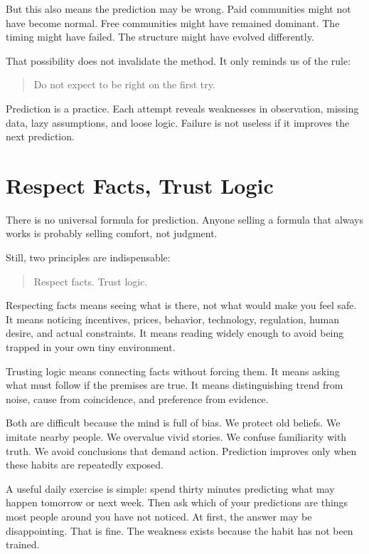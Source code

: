 But this also means the prediction may be wrong. Paid communities might not have become normal. Free communities might have remained dominant. The timing might have failed. The structure might have evolved differently.

That possibility does not invalidate the method. It only reminds us of the rule:

\begin{quote}
Do not expect to be right on the first try.
\end{quote}

Prediction is a practice. Each attempt reveals weaknesses in observation, missing data, lazy assumptions, and loose logic. Failure is not useless if it improves the next prediction.

\section*{Respect Facts, Trust Logic}

There is no universal formula for prediction. Anyone selling a formula that always works is probably selling comfort, not judgment.

Still, two principles are indispensable:

\begin{quote}
Respect facts. Trust logic.
\end{quote}

Respecting facts means seeing what is there, not what would make you feel safe. It means noticing incentives, prices, behavior, technology, regulation, human desire, and actual constraints. It means reading widely enough to avoid being trapped in your own tiny environment.

Trusting logic means connecting facts without forcing them. It means asking what must follow if the premises are true. It means distinguishing trend from noise, cause from coincidence, and preference from evidence.

Both are difficult because the mind is full of bias. We protect old beliefs. We imitate nearby people. We overvalue vivid stories. We confuse familiarity with truth. We avoid conclusions that demand action. Prediction improves only when these habits are repeatedly exposed.

A useful daily exercise is simple: spend thirty minutes predicting what may happen tomorrow or next week. Then ask which of your predictions are things most people around you have not noticed. At first, the answer may be disappointing. That is fine. The weakness exists because the habit has not been trained.

